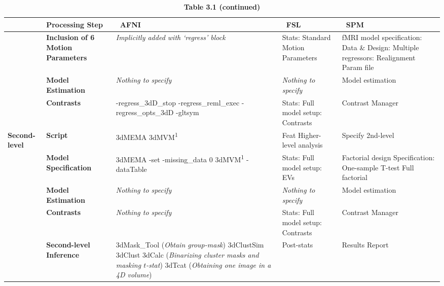 \begin{table}[htbp]
\hspace*{-1.5cm}
\begin{threeparttable}
\caption*{\textbf{Table 3.1 (continued)}}
\centering
\footnotesize
\begin{tabular}{@{}p{}*{4}{L{\tabcolsep\relax}}@{}}
\toprule
& \textbf{Processing Step} & \ \textbf{AFNI} & \ \textbf{FSL} & \ \textbf{SPM} \\
\midrule
& \textbf{Inclusion of 6 Motion Parameters} & \textit{Implicitly added with `regress' block} & Stats: Standard Motion Parameters & fMRI model specification: Data \& Design: Multiple regressors: Realignment Param file \\
\cmidrule(lr){2-5}
& \textbf{Model Estimation} & \textit{Nothing to specify} & \textit{Nothing to specify} & Model estimation\\
 \cmidrule(lr){2-5}
 & \textbf{Contrasts} & -regress\_3dD\_stop -regress\_reml\_exec -regress\_opts\_3dD -gltsym & Stats: Full model setup: Contrasts & Contrast Manager \\
 \midrule
 \textbf{Second-level} & \textbf{Script} & 3dMEMA \linebreak 3dMVM\textsuperscript{1} & Feat Higher-level analysis & Specify 2nd-level\\
 \cmidrule(lr){2-5}
 & \textbf{Model Specification} & 3dMEMA \linebreak -set \linebreak -missing\_data 0 \linebreak 3dMVM\textsuperscript{1} \linebreak -dataTable & Stats: Full model setup: EVs & Factorial design Specification: One-sample T-test \linebreak Full factorial \\
  \cmidrule(lr){2-5}
& \textbf{Model Estimation} & \textit{Nothing to specify} & \textit{Nothing to specify} & Model estimation \\
\cmidrule(lr){2-5}
& \textbf{Contrasts} & \textit{Nothing to specify} & Stats: Full model setup: Contrasts & Contrast Manager \\
\cmidrule(lr){2-5}
& \textbf{Second-level Inference} & 3dMask\_Tool (\textit{Obtain group-mask}) \linebreak 3dClustSim \linebreak 3dClust \linebreak 3dCalc (\textit{Binarizing cluster masks and masking $t$-stat}) \linebreak 3dTcat (\textit{Obtaining one image in a 4D volume}) & Post-stats & Results Report \\

\end{tabular}
\end{threeparttable}
\end{table}
